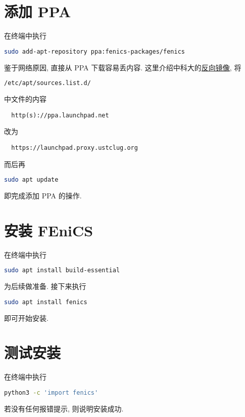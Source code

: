 \documentclass[fontset=founder]{ctexart}
\begin{document}
\section{添加 PPA}

在终端中执行
\begin{lstlisting}[language = bash]
  sudo add-apt-repository ppa:fenics-packages/fenics
\end{lstlisting}
鉴于网络原因,
直接从 PPA 下载容易丢内容.
这里介绍中科大的\href{https://lug.ustc.edu.cn/wiki/mirrors/help/revproxy/}{反向镜像},
将
\begin{lstlisting}[language = bash]
  /etc/apt/sources.list.d/
\end{lstlisting}
中文件的内容
\begin{lstlisting}
  http(s)://ppa.launchpad.net
\end{lstlisting}
改为
\begin{lstlisting}
  https://launchpad.proxy.ustclug.org
\end{lstlisting}
而后再
\begin{lstlisting}[language = bash]
  sudo apt update
\end{lstlisting}
即完成添加 PPA 的操作.

\section{安装 FEniCS}

在终端中执行
\begin{lstlisting}[language = bash]
  sudo apt install build-essential
\end{lstlisting}
为后续做准备.
接下来执行
\begin{lstlisting}[language = bash]
  sudo apt install fenics
\end{lstlisting}
即可开始安装.

\section{测试安装}

在终端中执行
\begin{lstlisting}[language = bash]
  python3 -c 'import fenics'
\end{lstlisting}
若没有任何报错提示,
则说明安装成功.
\end{document}
